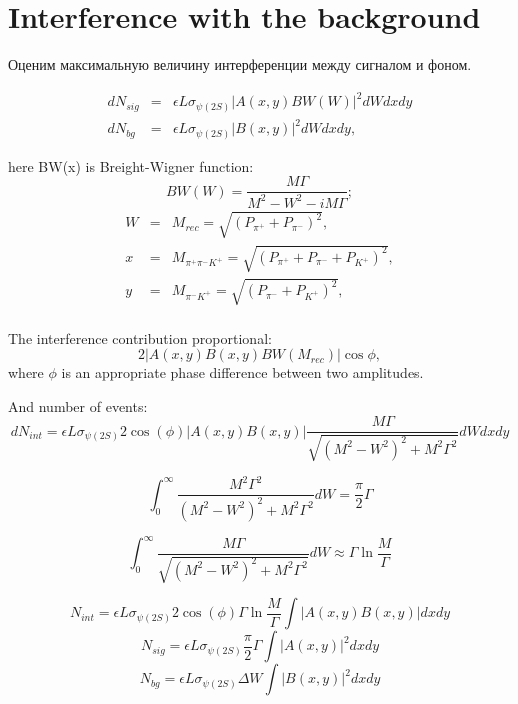 \documentclass[a4paper,12pt]{article}
\newcommand{\pipi}{\pi^{+}\pi^{-}}
\begin{document}
\section{Interference with the background}
Оценим максимальную величину интерференции между сигналом и фоном.

\begin{eqnarray}
  dN_{sig} & = & \epsilon L \sigma_{\psi(2S)} |A(x, y) BW(W)|^2  dW dx dy \\
  dN_{bg} & = & \epsilon L \sigma_{\psi(2S)}  |B(x, y)|^2  dW dx dy,
\end{eqnarray}

here BW(x) is Breight-Wigner function:
\begin{equation}
  BW(W) =  \frac{M \Gamma}{M^2-W^2 - iM\Gamma};
\end{equation}
\begin{eqnarray}
W & = & M_{rec} = \sqrt{(P_{\pi^+}+ P_{\pi^-})^2}, \nonumber \\
x & = & M_{\pipi K^+} = \sqrt{(P_{\pi^+}+ P_{\pi^-} + P_{K^+})^2}, \nonumber \\ 
y & = & M_{\pi^- K^+} = \sqrt{(P_{\pi^-} + P_{K^+})^2}, \nonumber \\
\end{eqnarray}


The interference contribution proportional:
\begin{equation}
  2 |A(x,y) B(x,y) BW(M_{rec})| \cos\phi,
\end{equation}
where $\phi$ is an appropriate phase difference between two amplitudes.


And number of events:
\begin{equation}
  dN_{int} = \epsilon L \sigma_{\psi(2S)} 2\cos(\phi)|A(x,y) B (x,y)|\frac{M \Gamma}{\sqrt{(M^2-W^2)^2 + M^2\Gamma^2}} dW dx dy
\end{equation}


\begin{equation}
  \int_{0}^{\infty}\frac{M^2 \Gamma^2}{(M^2-W^2)^2 + M^2\Gamma^2} dW = \frac{\pi}{2} \Gamma
\end{equation}

\begin{equation}
  \int_{0}^{\infty}\frac{M \Gamma}{\sqrt{(M^2-W^2)^2 + M^2\Gamma^2}} dW \approx \Gamma \ln\frac{M}{\Gamma}
\end{equation}

\begin{equation}
  N_{int} = \epsilon L \sigma_{\psi(2S)} 2\cos(\phi) \Gamma \ln\frac{M}{\Gamma}\int |A(x,y) B (x,y)|dxdy
\end{equation}
\begin{equation}
  N_{sig} = \epsilon L \sigma_{\psi(2S)} \frac{\pi}{2} \Gamma \int |A(x,y)|^2 dxdy
\end{equation}
\begin{equation}
  N_{bg} = \epsilon L \sigma_{\psi(2S)} \Delta W \int |B(x,y)|^2 dxdy
\end{equation}
\end{document}

